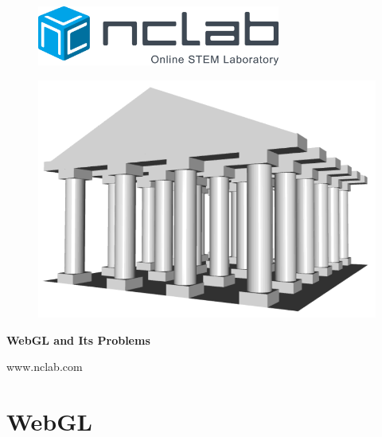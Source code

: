 \documentclass{article}
\begin{document}
\large

\vbox{}
\begin{figure}[!ht]
\includegraphics[width=8cm]{img/logo.png}
\vspace{12mm}
\end{figure}

\begin{figure}[!ht]
\begin{center}
\includegraphics[width=14cm]{img/plasm.png}
\vspace{16mm}
\end{center}
\end{figure}

\centerline{\Huge \bf WebGL and Its Problems}

\vfill

\centerline{\Large www.nclab.com}

\newpage
\hbox{}
\newpage





\newpage

\pagestyle{plain}

\setcounter{page}{1}
\section{WebGL}
\end{document}
